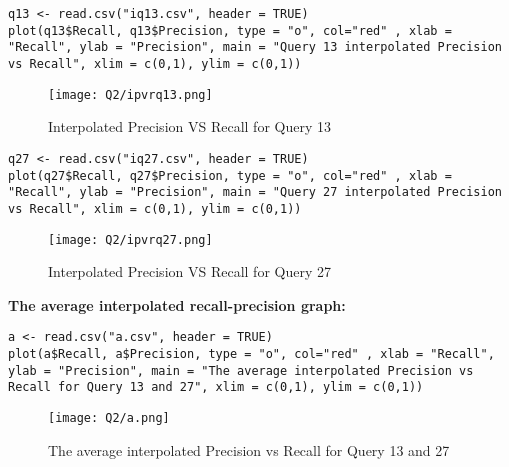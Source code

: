 \begin{lstlisting}[breakatwhitespace=〈false)]
q13 <- read.csv("iq13.csv", header = TRUE)
plot(q13$Recall, q13$Precision, type = "o", col="red" , xlab = "Recall", ylab = "Precision", main = "Query 13 interpolated Precision vs Recall", xlim = c(0,1), ylim = c(0,1))
\end{lstlisting}

\begin{figure}[h]
\caption{Interpolated Precision VS Recall for Query 13}
\centering
\texttt{[image: Q2/ipvrq13.png]}
\end{figure}


\begin{lstlisting}[breakatwhitespace=〈false)]
q27 <- read.csv("iq27.csv", header = TRUE)
plot(q27$Recall, q27$Precision, type = "o", col="red" , xlab = "Recall", ylab = "Precision", main = "Query 27 interpolated Precision vs Recall", xlim = c(0,1), ylim = c(0,1))
\end{lstlisting}


\begin{figure}[h]
\caption{Interpolated Precision VS Recall for Query 27}
\centering
\texttt{[image: Q2/ipvrq27.png]}
\end{figure}

\textbf{The average interpolated recall-precision graph:}

\begin{lstlisting}[breakatwhitespace=〈false)]
a <- read.csv("a.csv", header = TRUE)
plot(a$Recall, a$Precision, type = "o", col="red" , xlab = "Recall", ylab = "Precision", main = "The average interpolated Precision vs Recall for Query 13 and 27", xlim = c(0,1), ylim = c(0,1))
\end{lstlisting}


\begin{figure}[h]
\caption{The average interpolated Precision vs Recall for Query 13 and 27}
\centering
\texttt{[image: Q2/a.png]}
\end{figure}
